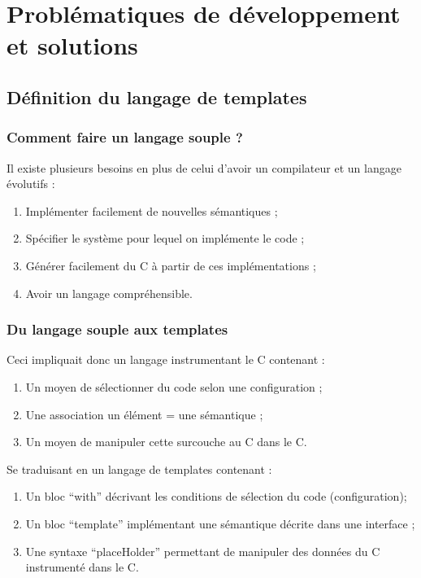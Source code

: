 \documentclass[]{beamer}
\begin{document}
\begin{frame}
\begin{columns}[c]
\end{columns}
\end{frame}

\section{Problématiques de développement et solutions}

\subsection{Définition du langage de templates}
\begin{frame}
\frametitle{Comment faire un langage souple ?}
Il existe plusieurs besoins en plus de celui d'avoir un compilateur et un
langage évolutifs :
\begin{enumerate}[<+->]
    \item Implémenter facilement de nouvelles sémantiques ;
    \item Spécifier le système pour lequel on implémente le code ;
    \item Générer facilement du C à partir de ces implémentations ;
    \item Avoir un langage compréhensible.
\end{enumerate}
\end{frame}

\begin{frame}
\frametitle{Du langage souple aux templates}
 {
    Ceci impliquait donc un langage instrumentant le C contenant :
    \begin{enumerate}[<+->]
        \item Un moyen de sélectionner du code selon une configuration ;
        \item Une association un élément = une sémantique ;
        \item Un moyen de manipuler cette surcouche au C dans le C.
    \end{enumerate}
}
 {
    Se traduisant en un langage de templates contenant :
    \begin{enumerate}
        \item Un bloc ``with'' décrivant les conditions de sélection
            du code (configuration);
        \item Un bloc ``template'' implémentant une sémantique décrite dans
            une interface ;
        \item Une syntaxe ``placeHolder'' permettant de manipuler
            des données du C instrumenté dans le C.
    \end{enumerate}
}
\end{frame}
\end{document}
